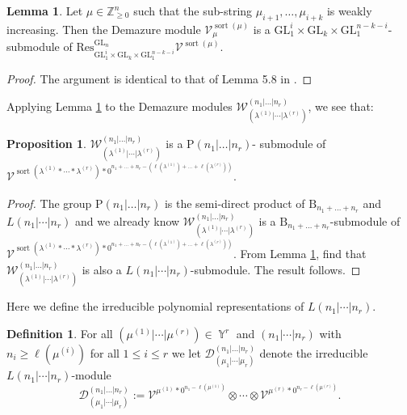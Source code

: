 \documentclass[12pt,reqno]{amsart}
\theoremstyle{definition}
\newtheorem{lem}[thm]{Lemma}
\newtheorem{prop}[thm]{Proposition}
\newtheorem{defn}[thm]{Definition}
\DeclareMathOperator{\Par}{\mathbb{Y}}
\DeclareMathOperator{\sort}{sort}
\begin{document}
\begin{lem}\label{parabolic Demazure lemma}
    Let $\mu \in \mathbb{Z}_{\geq 0}^{n}$ such that the sub-string $\mu_{i+1},\ldots, \mu_{i+k}$ is weakly increasing. Then the Demazure module $\mathcal{V}^{\sort(\mu)}_{\mu}$ is a $\mathrm{GL}_1^{i}\times \mathrm{GL}_{k} \times \mathrm{GL}_{1}^{n-k-i}$-submodule of $\mathrm{Res}_{\mathrm{GL}_1^{i}\times \mathrm{GL}_{k} \times \mathrm{GL}_{1}^{n-k-i}}^{\mathrm{GL}_n} \mathcal{V}^{\sort(\mu)}.$ 
\end{lem}
\begin{proof}
    The argument is identical to that of Lemma 5.8 in \cite{BWAlmostSymSchur}.
\end{proof}

Applying Lemma \ref{parabolic Demazure lemma} to the Demazure modules $\mathcal{W}_{(\lambda^{(1)}|\cdots | \lambda^{(r)})}^{(n_1|\ldots|n_r)}$, we see that:

\begin{prop}\label{parabolic Demazure prop}
    $\mathcal{W}_{(\lambda^{(1)}|\cdots | \lambda^{(r)})}^{(n_1|\ldots|n_r)}$ is a $\mathrm{P}(n_1|\ldots|n_r)$- submodule of $\mathcal{V}^{\sort(\lambda^{(1)}*\cdots *\lambda^{(r)})*0^{n_1+\ldots+n_r - (\ell(\lambda^{(1)})+\ldots + \ell(\lambda^{(r)}))}}.$
\end{prop}
\begin{proof}
    The group $\mathrm{P}(n_1|\ldots|n_r)$ is the semi-direct product of $\mathrm{B}_{n_1+\ldots+n_r}$ and $L(n_1|\cdots |n_r)$ and we already know $\mathcal{W}_{(\lambda^{(1)}|\cdots | \lambda^{(r)})}^{(n_1|\ldots|n_r)}$ is a $\mathrm{B}_{n_1+\ldots+n_r}$-submodule of $\mathcal{V}^{\sort(\lambda^{(1)}*\cdots *\lambda^{(r)})*0^{n_1+\ldots+n_r - (\ell(\lambda^{(1)})+\ldots + \ell(\lambda^{(r)}))}}$. From Lemma \ref{parabolic Demazure lemma}, find that $\mathcal{W}_{(\lambda^{(1)}|\cdots | \lambda^{(r)})}^{(n_1|\ldots|n_r)}$ is also a $L(n_1|\cdots |n_r)$-submodule. The result follows.
\end{proof}

Here we define the irreducible polynomial representations of $L(n_1|\cdots | n_r)$.

\begin{defn}
    For all $(\mu^{(1)}|\cdots |\mu^{(r)}) \in \Par^r $ and $(n_1|\cdots|n_r)$ with $n_i \geq \ell(\mu^{(i)})$ for all $1 \leq i \leq r$ we let $\mathcal{D}^{(n_1|\ldots|n_r)}_{(\mu_1|\cdots|\mu_r)}$ denote the irreducible $L(n_1|\cdots | n_r)$-module 
    $$\mathcal{D}^{(n_1|\ldots|n_r)}_{(\mu_1|\cdots|\mu_r)}:= \mathcal{V}^{\mu^{(1)}*0^{n_1-\ell(\mu^{(1)})}}\otimes \cdots \otimes \mathcal{V}^{\mu^{(r)}*0^{n_r - \ell(\mu^{(r)})}}.$$
\end{defn}
\end{document}
